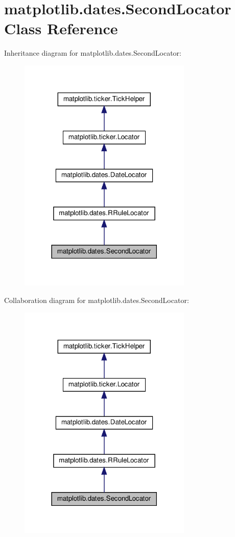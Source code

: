 \hypertarget{classmatplotlib_1_1dates_1_1SecondLocator}{}\section{matplotlib.\+dates.\+Second\+Locator Class Reference}
\label{classmatplotlib_1_1dates_1_1SecondLocator}


Inheritance diagram for matplotlib.\+dates.\+Second\+Locator\+:
\nopagebreak
\begin{figure}[H]
\begin{center}
\leavevmode
\includegraphics[width=234pt]{classmatplotlib_1_1dates_1_1SecondLocator__inherit__graph}
\end{center}
\end{figure}


Collaboration diagram for matplotlib.\+dates.\+Second\+Locator\+:
\nopagebreak
\begin{figure}[H]
\begin{center}
\leavevmode
\includegraphics[width=234pt]{classmatplotlib_1_1dates_1_1SecondLocator__coll__graph}
\end{center}
\end{figure}
